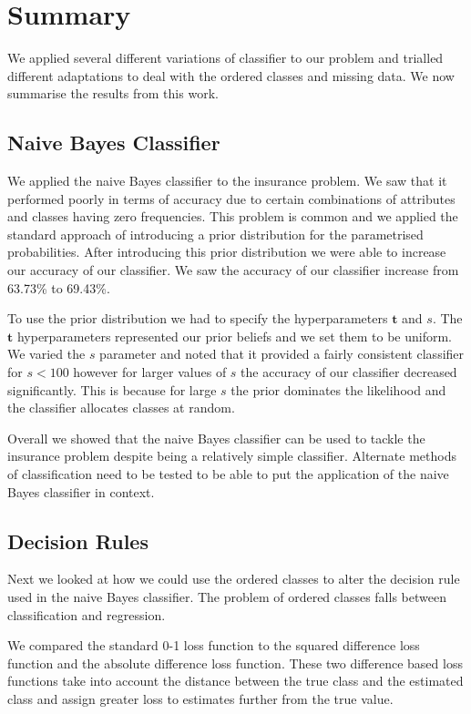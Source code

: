 \chapter{Summary}

We applied several different variations of classifier to our problem and trialled different adaptations to deal with the ordered classes and missing data.
We now summarise the results from this work.

\section{Naive Bayes Classifier}

We applied the naive Bayes classifier to the insurance problem.
We saw that it performed poorly in terms of accuracy due to certain combinations of attributes and classes having zero frequencies.
This problem is common and we applied the standard approach of introducing a prior distribution for the parametrised probabilities.
After introducing this prior distribution we were able to increase our accuracy of our classifier.
We saw the accuracy of our classifier increase from 63.73\% to 69.43\%.

To use the prior distribution we had to specify the hyperparameters $\mathbf{t}$ and $s$.
The $\mathbf{t}$ hyperparameters represented our prior beliefs and we set them to be uniform.
We varied the $s$ parameter and noted that it provided a fairly consistent classifier for $s<100$ however for larger values of $s$ the accuracy of our classifier decreased significantly.
This is because for large $s$ the prior dominates the likelihood and the classifier allocates classes at random.

Overall we showed that the naive Bayes classifier can be used to tackle the insurance problem despite being a relatively simple classifier.
Alternate methods of classification need to be tested to be able to put the application of the naive Bayes classifier in context.

\section{Decision Rules}

Next we looked at how we could use the ordered classes to alter the decision rule used in the naive Bayes classifier.
The problem of ordered classes falls between classification and regression.

We compared the standard 0-1 loss function to the squared difference loss function and the absolute difference loss function. 
These two difference based loss functions take into account the distance between the true class and the estimated class and assign greater loss to estimates further from the true value.

